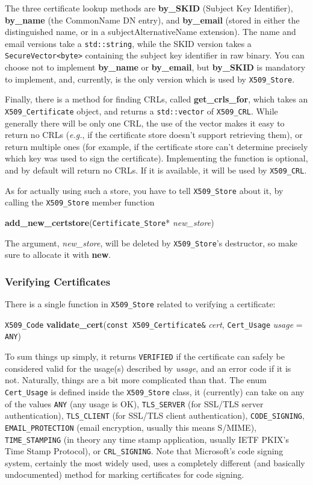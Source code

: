 \documentclass{article}
\newcommand{\function}[1]{\textbf{#1}}
\newcommand{\type}[1]{\texttt{#1}}
\renewcommand{\arg}[1]{\textsl{#1}}
\newcommand{\eg}[0]{\emph{e.g.}}
\begin{document}
The three certificate lookup methods are \function{by\_SKID} (Subject Key
Identifier), \function{by\_name} (the CommonName DN entry), and
\function{by\_email} (stored in either the distinguished name, or in a
subjectAlternativeName extension). The name and email versions take a
\type{std::string}, while the SKID version takes a \type{SecureVector<byte>}
containing the subject key identifier in raw binary. You can choose not to
implement \function{by\_name} or \function{by\_email}, but \function{by\_SKID}
is mandatory to implement, and, currently, is the only version which is used by
\type{X509\_Store}.

Finally, there is a method for finding CRLs, called \function{get\_crls\_for},
which takes an \type{X509\_Certificate} object, and returns a
\type{std::vector} of \type{X509\_CRL}. While generally there will be only one
CRL, the use of the vector makes it easy to return no CRLs (\eg, if the
certificate store doesn't support retrieving them), or return multiple ones
(for example, if the certificate store can't determine precisely which key was
used to sign the certificate). Implementing the function is optional, and by
default will return no CRLs. If it is available, it will be used by
\type{X509\_CRL}.

As for actually using such a store, you have to tell \type{X509\_Store} about
it, by calling the \type{X509\_Store} member function

\function{add\_new\_certstore}(\type{Certificate\_Store}* \arg{new\_store})

The argument, \arg{new\_store}, will be deleted by \type{X509\_Store}'s
destructor, so make sure to allocate it with \function{new}.

\subsubsection{Verifying Certificates}

There is a single function in \type{X509\_Store} related to verifying a
certificate:

\type{X509\_Code}
\function{validate\_cert}(\type{const X509\_Certificate\&} \arg{cert},
                          \type{Cert\_Usage} \arg{usage} = \type{ANY})

To sum things up simply, it returns \type{VERIFIED} if the certificate can
safely be considered valid for the usage(s) described by \arg{usage}, and an
error code if it is not. Naturally, things are a bit more complicated than
that. The enum \type{Cert\_Usage} is defined inside the \type{X509\_Store}
class, it (currently) can take on any of the values \type{ANY} (any usage is
OK), \type{TLS\_SERVER} (for SSL/TLS server authentication), \type{TLS\_CLIENT}
(for SSL/TLS client authentication), \type{CODE\_SIGNING},
\type{EMAIL\_PROTECTION} (email encryption, usually this means S/MIME),
\type{TIME\_STAMPING} (in theory any time stamp application, usually IETF
PKIX's Time Stamp Protocol), or \type{CRL\_SIGNING}. Note that Microsoft's code
signing system, certainly the most widely used, uses a completely different
(and basically undocumented) method for marking certificates for code signing.
\end{document}
